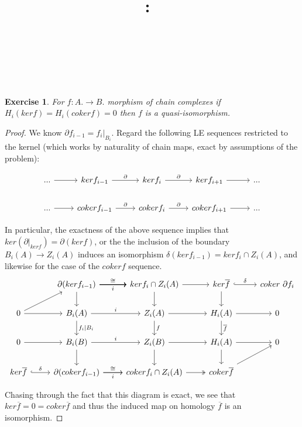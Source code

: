 \documentclass{article}
\title{
    \vspace{2in}
    \textmd{\textbf{\hmwkClass:\ \hmwkTitle}}\\
    \vspace{0.1in}
    \textmd{\hmwkDueDate} \\
    \vspace{0.2in}\large{\textit{\hmwkClassInstructor\  }}
    \vspace{2in}
}
\author{\hmwkAuthorName}
\date{}
\newtheorem{exercise}{Exercise}
\begin{document}
\maketitle

\newpage

\begin{exercise}
  For $f:A. \to B.$ morphism of chain complexes if $H_{i}(kerf) = H_{i}(cokerf) = 0$ then $f$ is a quasi-isomorphism. 
\end{exercise}

\begin{proof}
  We know $\partial f_{i-1} = f_{i}|_{B_{i}}$. Regard the following LE sequences restricted to the kernel (which works by naturality of chain maps, exact by assumptions of the problem):

  \[
    \begin{tikzcd}
      ... \arrow[r] & kerf_{i-1} \arrow[r, "\partial"] & kerf_{i} \arrow[r, "\partial"] & kerf_{i+1} \arrow[r] & ... \\
... \arrow[r] & cokerf_{i-1} \arrow[r, "\partial"] & cokerf_{i} \arrow[r, "\partial"] & cokerf_{i+1} \arrow[r] & ...
\end{tikzcd}
\]

In particular, the exactness of the above sequence implies that $ker (\partial |_{ker f}) = \partial(ker f)$, or the the inclusion of the boundary $B_{i}(A) \to Z_{i}(A)$ induces an isomorphism $\delta(kerf_{i-1}) = ker f_{i} \cap Z_{i}(A)$, and likewise for the case of the $coker f$ sequence.
\[
  \begin{tikzcd}
                                          & \partial (ker f_{i-1}) \arrow[r, "\cong"] \arrow[d] \arrow[r] \arrow[r] \arrow[r] \arrow[r, "i"'] & kerf_{i} \cap{Z_{i}(A)} \arrow[r] \arrow[d]     & ker \overline f \arrow[d] \arrow[r, "\delta", hook] & coker \ \partial f_{i} \\
0 \arrow[r] \arrow[ru]                    & B_{i}(A) \arrow[r, "i"] \arrow[d, "f_{i}|B_{i}"]                                                  & Z_{i}(A) \arrow[r] \arrow[d, "f"]            & H_{i}(A) \arrow[r] \arrow[d, "\overline f"]         & 0                      \\
0 \arrow[r]                               & B_{i}(B) \arrow[r, "i"] \arrow[d]                                                                 & Z_{i}(B) \arrow[r] \arrow[d]                 & H_{i}(A) \arrow[r] \arrow[d]                        & 0                      \\
ker \overline f \arrow[r, "\delta", hook] & \partial (coker f_{i-1}) \arrow[r, "\cong"] \arrow[r, "i"']                                       & coker f_{i}\cap {Z_{i}(A)} \arrow[r, two heads] & coker \overline f \arrow[ru]                        &                       
\end{tikzcd}
\]

Chasing through the fact that this diagram is exact, we see that $ker \overline f = 0 = coker \overline f$ and thus the induced map on homology $\overline f$ is an isomorphism. 
\end{proof}
\end{document}
